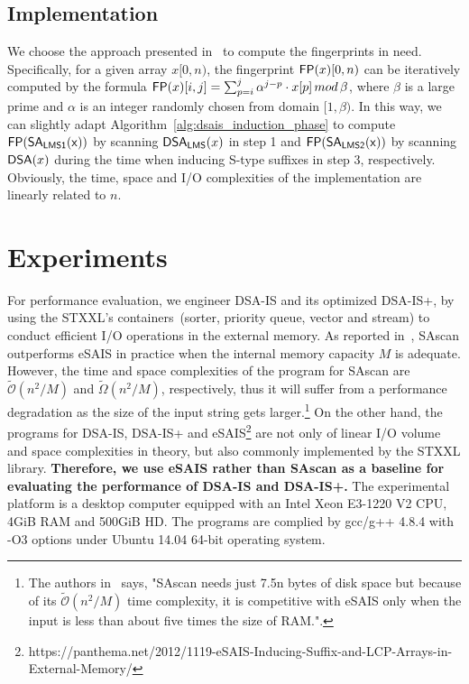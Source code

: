 \documentclass[10pt,journal,compsoc]{IEEEtran}
\begin{document}
\subsection{Implementation} \label{subsec:sachecker:implementation}
We choose the approach presented in~\cite{Karp1987} to compute the fingerprints in need. Specifically, for a given array $x[0, n)$, the fingerprint ${\sf FP}(x)[0, n)$ can be iteratively computed by the formula ${\sf FP}(x)[i,j] = \sum_{p = i}^{j} \alpha^{j-p} \cdot x[p] \, mod \, \beta$, where $\beta$ is a large prime and $\alpha$ is an integer randomly chosen from domain $[1,\beta)$. In this way, we can slightly adapt Algorithm~\ref{alg:dsais_induction_phase} to compute ${\sf FP}(\sf SA_{LMS1}(x))$ by scanning ${\sf DSA_{LMS}}(x)$ in step 1 and ${\sf FP}(\sf SA_{LMS2}(x))$ by scanning ${\sf DSA}(x)$ during the time when inducing S-type suffixes in step 3, respectively. Obviously, the time, space and I/O complexities of the implementation are linearly related to $n$.

\section{Experiments} \label{sec:experiments}

For performance evaluation, we engineer DSA-IS and its optimized DSA-IS+, by using the STXXL's containers~(sorter, priority queue, vector and stream) to conduct efficient I/O operations in the external memory. As reported in~\cite{Karkkainen2014}, SAscan outperforms eSAIS in practice when the internal memory capacity $M$ is adequate. However, the time and space complexities of the program for SAscan are $\widetilde{\mathcal{O}}(n^2/ M)$ and $\widetilde{\Omega}(n^2/ M)$, respectively, thus it will suffer from a performance degradation as the size of the input string gets larger.\footnote{The authors in~\cite{Karkkainen2015} says, "SAscan needs just 7.5n bytes of disk space but because of its $\widetilde{\mathcal{O}}(n^2/ M)$ time complexity, it is competitive with eSAIS only when the input is less than about five times the size of RAM.".} On the other hand, the programs for DSA-IS, DSA-IS+ and eSAIS\footnote{https://panthema.net/2012/1119-eSAIS-Inducing-Suffix-and-LCP-Arrays-in-External-Memory/} are not only of linear I/O volume and space complexities in theory, but also commonly implemented by the STXXL library. \textbf{Therefore, we use eSAIS rather than SAscan as a baseline for evaluating the performance of DSA-IS and DSA-IS+.} The experimental platform is a desktop computer equipped with an Intel Xeon E3-1220 V2 CPU, 4GiB RAM and 500GiB HD. The programs are complied by gcc/g++ 4.8.4 with -O3 options under Ubuntu 14.04 64-bit operating system.
\end{document}
